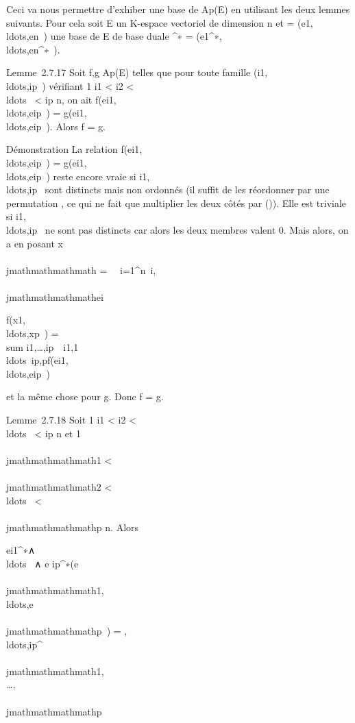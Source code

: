 Ceci va nous permettre d'exhiber une base de Ap(E) en
utilisant les deux lemmes suivants. Pour cela soit E un K-espace
vectoriel de dimension n et  =
(e1,\\ldots,en~)
une base de E de base duale ^∗ =
(e1^∗,\\ldots,en^∗~).

Lemme~2.7.17 Soit f,g \in Ap(E) telles que pour toute famille
(i1,\\ldots,ip~)
vérifiant 1 \leq i1 \textless{} i2 \textless{}
\\ldots~ \textless{}
ip \leq n, on ait
f(ei1,\\ldots,eip~)
=
g(ei1,\\ldots,eip~).
Alors f = g.

Démonstration La relation
f(ei1,\\ldots,eip~)
=
g(ei1,\\ldots,eip~)
reste encore vraie si
i1,\\ldots,ip~
sont distincts mais non ordonnés (il suffit de les réordonner par une
permutation \sigma, ce qui ne fait que multiplier les deux côtés par \epsilon(\sigma)).
Elle est triviale si
i1,\\ldots,ip~
ne sont pas distincts car alors les deux membres valent 0. Mais alors,
on a en posant x\\\\jmathmathmathmath =\
\sum ~
i=1^n\xi~i,\\\\jmathmathmathmathei

f(x1,\\ldots,xp~)
= \\sum
i1,\ldots,ip\in{}~\xi~i1,1\\ldots\xi~ip,pf(ei1,\\ldots,eip~)

et la même chose pour g. Donc f = g.

Lemme~2.7.18 Soit 1 \leq i1 \textless{} i2 \textless{}
\\ldots~ \textless{}
ip \leq n et 1 \leq \\\\jmathmathmathmath1 \textless{} \\\\jmathmathmathmath2
\textless{} \\ldots~
\textless{} \\\\jmathmathmathmathp \leq n. Alors

ei1^∗∧\\ldots~
∧ e ip^∗(e
\\\\jmathmathmathmath1,\\ldots,e\\\\jmathmathmathmathp~)
=
,\\ldots,ip^\\\\jmathmathmathmath1,\\\ldots,\\\\jmathmathmathmathp~


